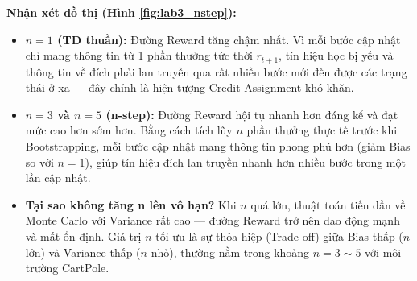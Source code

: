 \textbf{Nhận xét đồ thị (Hình \ref{fig:lab3_nstep}):}
\begin{itemize}
    \item \textbf{$n=1$ (TD thuần):} Đường Reward tăng chậm nhất. Vì mỗi bước cập nhật chỉ mang thông tin từ 1 phần thưởng tức thời $r_{t+1}$, tín hiệu học bị yếu và thông tin về đích phải lan truyền qua rất nhiều bước mới đến được các trạng thái ở xa — đây chính là hiện tượng Credit Assignment khó khăn.
    \item \textbf{$n=3$ và $n=5$ (n-step):} Đường Reward hội tụ nhanh hơn đáng kể và đạt mức cao hơn sớm hơn. Bằng cách tích lũy $n$ phần thưởng thực tế trước khi Bootstrapping, mỗi bước cập nhật mang thông tin phong phú hơn (giảm Bias so với $n=1$), giúp tín hiệu đích lan truyền nhanh hơn nhiều bước trong một lần cập nhật.
    \item \textbf{Tại sao không tăng n lên vô hạn?} Khi $n$ quá lớn, thuật toán tiến dần về Monte Carlo với Variance rất cao — đường Reward trở nên dao động mạnh và mất ổn định. Giá trị $n$ tối ưu là sự thỏa hiệp (Trade-off) giữa Bias thấp ($n$ lớn) và Variance thấp ($n$ nhỏ), thường nằm trong khoảng $n = 3 \sim 5$ với môi trường CartPole.
\end{itemize}

